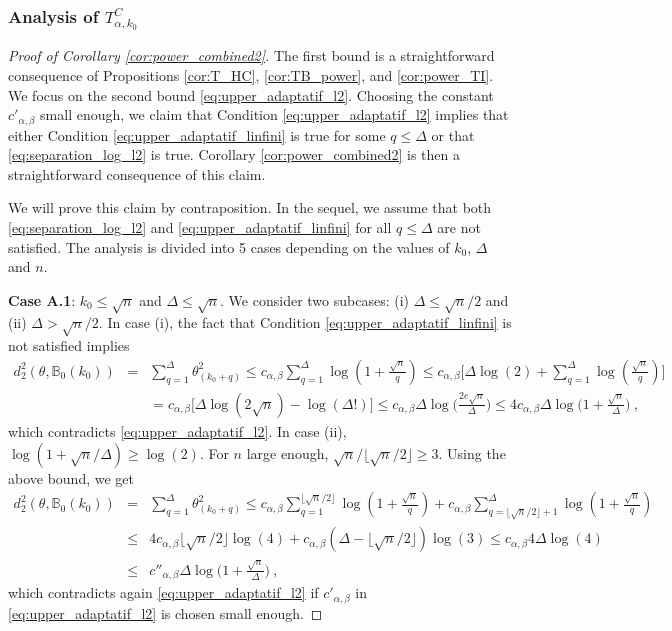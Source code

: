 \documentclass[twoside,11pt]{article}
\def\beqn{\begin{eqnarray*}}
\def\eeqn{\end{eqnarray*}}
\newcommand{\<}{\langle}
\renewcommand{\>}{\rangle}
\begin{document}
 
 


 
\subsubsection{Analysis of $T^C_{\alpha,k_0}$}

 
 \begin{proof}[Proof of Corollary \ref{cor:power_combined2}]
 The first bound is a straightforward consequence of Propositions \ref{cor:T_HC}, \ref{cor:TB_power}, and \ref{cor:power_TI}. We focus on the second bound \eqref{eq:upper_adaptatif_l2}. Choosing the constant $c'_{\alpha,\beta}$ small enough, we claim that Condition \eqref{eq:upper_adaptatif_l2} implies that either Condition \eqref{eq:upper_adaptatif_linfini} is true for some $q\leq \Delta$ or that \eqref{eq:separation_log_l2} is true. Corollary \ref{cor:power_combined2} is then a straightforward consequence of this claim.
 
 
 We will prove this claim by contraposition. In the sequel, we assume that both \eqref{eq:separation_log_l2} and \eqref{eq:upper_adaptatif_linfini} for all $q\leq \Delta$ are not satisfied. The analysis is divided into 5 cases depending on the values of $k_0$, $\Delta$ and $n$.
 
 \bigskip 
 
 \noindent 
 {\bf Case A.1}: $k_0\leq \sqrt{n}$ and $\Delta\leq \sqrt{n}$. We consider two subcases: (i) $\Delta\leq \sqrt{n}/2$ and (ii) $\Delta> \sqrt{n}/2$. In case (i), the fact that Condition \eqref{eq:upper_adaptatif_linfini} is not satisfied implies 
 \beqn 
 d^2_2(\theta,\mathbb{B}_0(k_0))&=& \sum_{q=1}^{\Delta}\theta^2_{(k_0+q)}\leq c_{\alpha,\beta}\sum_{q=1}^{\Delta}\log(1+ \frac{\sqrt{n}}{q})\leq c_{\alpha,\beta}\big[ \Delta\log(2) + \sum_{q=1}^{\Delta}\log(\frac{\sqrt{n}}{q})\Big]\\ &&=c_{\alpha,\beta}\Big[ \Delta\log(2\sqrt{n})-\log(\Delta!)\Big]\leq c_{\alpha,\beta} \Delta\log\big(\frac{2e \sqrt{n}}{\Delta}\big)\leq 4c_{\alpha,\beta}\Delta\log\big(1+ \frac{\sqrt{n}}{\Delta}\big)\ ,
 \eeqn 
 which contradicts  \eqref{eq:upper_adaptatif_l2}.
 In case (ii), $\log(1+\sqrt{n}/\Delta)\geq\log(2)$. For $n$ large enough, $\sqrt{n}/\lfloor \sqrt{n}/2\rfloor\geq 3$.  Using the above bound, we get
 \beqn 
 d^2_2(\theta,\mathbb{B}_0(k_0))&=& \sum_{q=1}^{\Delta}\theta^2_{(k_0+q)}\leq c_{\alpha,\beta} \sum_{q=1}^{\lfloor \sqrt{n}/2\rfloor}\log(1+ \frac{\sqrt{n}}{q})+ c_{\alpha,\beta} \sum_{q=\lfloor \sqrt{n}/2\rfloor+1}^{\Delta}\log(1+ \frac{\sqrt{n}}{q})\\ 
 & \leq & 4c_{\alpha,\beta} \lfloor \sqrt{n}/2\rfloor\log(4)+ c_{\alpha,\beta} (\Delta- \lfloor \sqrt{n}/2\rfloor)\log(3)
 \leq c_{\alpha,\beta} 4\Delta \log(4)\\ &\leq& c''_{\alpha,\beta} \Delta\log\big(1+ \frac{\sqrt{n}}{\Delta}\big)\ ,
 \eeqn 
  which contradicts again \eqref{eq:upper_adaptatif_l2} if $c'_{\alpha,\beta}$ in \eqref{eq:upper_adaptatif_l2} is chosen small enough.
 

\end{proof}
\end{document}
